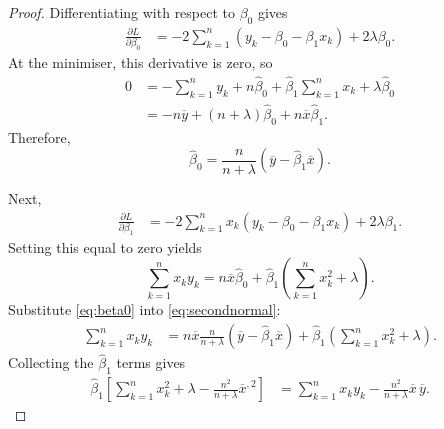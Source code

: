 ﻿\documentclass[11pt]{article}
\begin{document}
\begin{proof}
Differentiating with respect to $\beta_0$ gives
\begin{align*}
\frac{\partial L}{\partial\beta_0}
&=-2\sum_{k=1}^n(y_k-\beta_0-\beta_1x_k)+2\lambda\beta_0.
\end{align*}
At the minimiser, this derivative is zero, so
\begin{align*}
0
&=-\sum_{k=1}^n y_k+n\widehat\beta_0
  +\widehat\beta_1\sum_{k=1}^n x_k+\lambda\widehat\beta_0\\
&=-n\overline y+(n+\lambda)\widehat\beta_0
  +n\overline x\widehat\beta_1.
\end{align*}
Therefore,
\begin{equation}
\boxed{
\widehat\beta_0
=\frac{n}{n+\lambda}
  (\overline y-\widehat\beta_1\overline x).}
\label{eq:beta0}
\end{equation}

Next,
\begin{align*}
\frac{\partial L}{\partial\beta_1}
&=-2\sum_{k=1}^n x_k(y_k-\beta_0-\beta_1x_k)
  +2\lambda\beta_1.
\end{align*}
Setting this equal to zero yields
\begin{equation}
\sum_{k=1}^n x_ky_k
=n\overline x\widehat\beta_0
+\widehat\beta_1\left(\sum_{k=1}^n x_k^2+\lambda\right).
\label{eq:secondnormal}
\end{equation}
Substitute \eqref{eq:beta0} into \eqref{eq:secondnormal}:
\begin{align*}
\sum_{k=1}^n x_ky_k
&=n\overline x\frac{n}{n+\lambda}
  (\overline y-\widehat\beta_1\overline x)
  +\widehat\beta_1\left(\sum_{k=1}^n x_k^2+\lambda\right).
\end{align*}
Collecting the $\widehat\beta_1$ terms gives
\begin{align}
\widehat\beta_1
\left[
\sum_{k=1}^n x_k^2+\lambda
-\frac{n^2}{n+\lambda}\overline x^{,2}
\right]
&=
\sum_{k=1}^n x_ky_k
-\frac{n^2}{n+\lambda}\overline x\,\overline y.
\label{eq:uncentered}
\end{align}


\end{proof}
\end{document}
